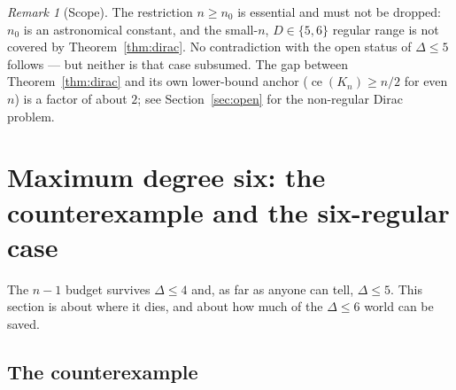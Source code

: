 \documentclass[a4paper,11pt]{amsart}
\theoremstyle{definition}
\theoremstyle{remark}
\newtheorem{remark}[theorem]{Remark}
\newcommand{\ce}{\operatorname{ce}}
\begin{document}
\begin{remark}[Scope]\label{rem:diracscope}
The restriction $n\ge n_0$ is essential and must not be dropped: $n_0$ is an astronomical constant, and the
small-$n$, $D\in\{5,6\}$ regular range is not covered by Theorem~\ref{thm:dirac}. No contradiction with the
open status of $\Delta\le5$ follows --- but neither is that case subsumed. The gap between
Theorem~\ref{thm:dirac} and its own lower-bound anchor ($\ce(K_n)\ge n/2$ for even $n$) is a factor of
about $2$; see Section~\ref{sec:open} for the non-regular Dirac problem.
\end{remark}

\section{Maximum degree six: the counterexample and the six-regular case}\label{sec:delta6}

The $n-1$ budget survives $\Delta\le4$ \cite{AABC25} and, as far as anyone can tell, $\Delta\le5$. This
section is about where it dies, and about how much of the $\Delta\le6$ world can be saved.

\subsection{The counterexample}
\end{document}
